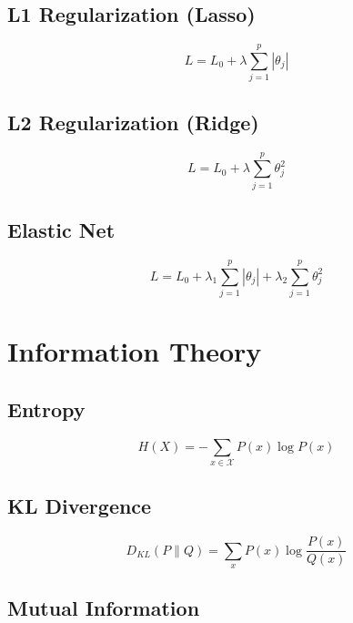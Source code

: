\subsection{L1 Regularization (Lasso)}

\begin{equation}
L = L_0 + \lambda \sum_{j=1}^{p} |\theta_j|
\end{equation}

\subsection{L2 Regularization (Ridge)}

\begin{equation}
L = L_0 + \lambda \sum_{j=1}^{p} \theta_j^2
\end{equation}

\subsection{Elastic Net}

\begin{equation}
L = L_0 + \lambda_1 \sum_{j=1}^{p} |\theta_j| + \lambda_2 \sum_{j=1}^{p} \theta_j^2
\end{equation}

\section{Information Theory}

\subsection{Entropy}

\begin{equation}
H(X) = -\sum_{x \in \mathcal{X}} P(x) \log P(x)
\end{equation}

\subsection{KL Divergence}

\begin{equation}
D_{KL}(P \parallel Q) = \sum_{x} P(x) \log\frac{P(x)}{Q(x)}
\end{equation}

\subsection{Mutual Information}

